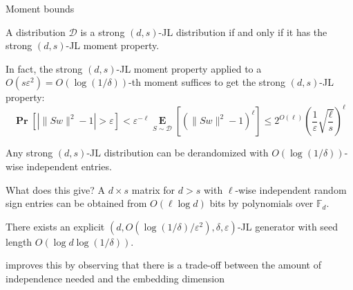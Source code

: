 \documentclass[10pt]{beamer}
\newcommand{\F}{\mathbb{F}}
\renewcommand{\P}{\operatorname*{\mathbf{Pr}}}
\newcommand{\E}{\operatorname*{\mathbf{E}}}
\renewcommand{\l}{\left}
\renewcommand{\r}{\right}
\newcommand{\eps}{\varepsilon}
\begin{document}
\begin{frame}{Moment bounds}
  \begin{theorem}
    A distribution $\mathcal{D}$ is a strong $(d,s)$-JL distribution if and
    only if it has the strong $(d,s)$-JL moment property.
  \end{theorem}

  \pause\bigskip

  In fact, the strong $(d,s)$-JL moment property applied to a
  $O(s\eps^2)=O( \log(1/\delta))$-th moment suffices to get the strong
  $(d,s)$-JL property:
  \begin{equation}
    \label{eq:main}
    \P\l[|\|Sw\|^2-1|>\eps\r]<\eps^{-\ell}
    \E_{S\sim\mathcal{D}}\l[(\|Sw\|^2-1)^\ell\r]\leq2^{O(\ell)}
    \l(\frac{1}{\eps}\sqrt{\frac{\ell}{s}}\r)^\ell
  \end{equation}

  \pause

  \begin{theorem}
    Any strong $(d,s)$-JL distribution can be derandomized with
    $O(\log(1/\delta))$-wise independent entries.
  \end{theorem}
\end{frame}

\begin{frame}{What does this give?}
  A $d\times s$ matrix for $d>s$ with $\ell$-wise independent random
  sign entries can be obtained from $O(\ell\log d)$ bits by
  polynomials over $\F_d$.

  \pause\bigskip\bigskip
  \begin{theorem} There exists an explicit
    $(d,O(\log(1/\delta)/\eps^2),\delta,\eps)$-JL generator with seed
    length $O(\log d \log (1/\delta))$.
  \end{theorem}

  \pause\bigskip\bigskip
  \cite{kane2011almost} improves this by observing that
  there is a trade-off between the amount of independence needed and
  the embedding dimension
\end{frame}
\end{document}
